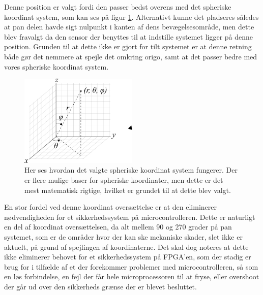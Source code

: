 Denne position er valgt fordi den passer bedst overens med det spheriske koordinat system, som kan ses på figur \ref{fig:Spherical}. Alternativt kunne det pladseres således at pan delen havde sigt nulpunkt i kanten  af dens bevægelsesområde, men dette blev fravalgt da den sensor der benyttes til at indstille systemet ligger på denne position. Grunden til at dette ikke er gjort for tilt systemet er at denne retning både gør det nemmere at spejle det omkring origo, samt at det passer bedre med vores spheriske koordinat system.
\begin{figure}[!hb]
	\begin{center}
		\includegraphics[width=0.5\textwidth]{Billeder/Spherical.png}
	\end{center}		
	\caption{Her ses hvordan det valgte spheriske koordinat system fungerer. Der er flere mulige baser for spheriske koordinater, men dette er det mest matematisk rigtige, hvilket er grundet til at dette blev valgt.}
	\label{fig:Spherical}
\end{figure}
En stor fordel ved denne koordinat oversættelse er at den eliminerer nødvendigheden for et sikkerhedssystem på microcontrolleren. Dette er naturligt en del af koordinat oversættelsen, da alt mellem 90 og 270 grader på pan systemet, som er de områder hvor der kan ske mekaniske skader, slet ikke er aktuelt, på grund af spejlingen af koordinaterne. Det skal dog noteres at dette ikke eliminerer behovet for et sikkerhedssystem på FPGA'en, som der stadig er brug for i tilfælde af et der forekommer problemer med microcontrolleren, så som en løs forbindelse, en fejl der får hele microprocessoren til at fryse, eller overshoot der går ud over den sikkerheds grænse der er blevet besluttet.




















